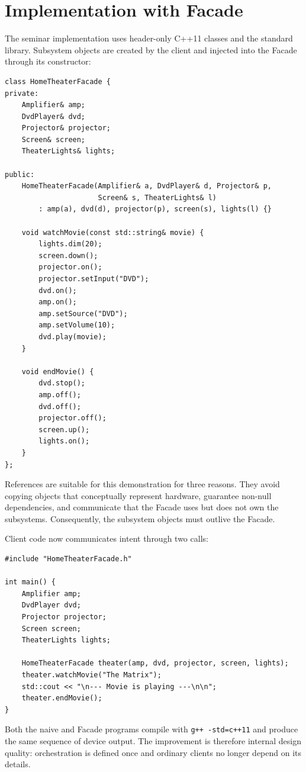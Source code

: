 \documentclass[11pt,a4paper]{report}
\begin{document}
\section{Implementation with Facade}
The seminar implementation uses header-only C++11 classes and the standard
library. Subsystem objects are created by the client and injected into the
Facade through its constructor:

\begin{lstlisting}[style=cpp]
class HomeTheaterFacade {
private:
    Amplifier& amp;
    DvdPlayer& dvd;
    Projector& projector;
    Screen& screen;
    TheaterLights& lights;

public:
    HomeTheaterFacade(Amplifier& a, DvdPlayer& d, Projector& p,
                      Screen& s, TheaterLights& l)
        : amp(a), dvd(d), projector(p), screen(s), lights(l) {}

    void watchMovie(const std::string& movie) {
        lights.dim(20);
        screen.down();
        projector.on();
        projector.setInput("DVD");
        dvd.on();
        amp.on();
        amp.setSource("DVD");
        amp.setVolume(10);
        dvd.play(movie);
    }

    void endMovie() {
        dvd.stop();
        amp.off();
        dvd.off();
        projector.off();
        screen.up();
        lights.on();
    }
};
\end{lstlisting}

References are suitable for this demonstration for three reasons. They avoid
copying objects that conceptually represent hardware, guarantee non-null
dependencies, and communicate that the Facade uses but does not own the
subsystems. Consequently, the subsystem objects must outlive the Facade.

Client code now communicates intent through two calls:

\begin{lstlisting}[style=cpp]
#include "HomeTheaterFacade.h"

int main() {
    Amplifier amp;
    DvdPlayer dvd;
    Projector projector;
    Screen screen;
    TheaterLights lights;

    HomeTheaterFacade theater(amp, dvd, projector, screen, lights);
    theater.watchMovie("The Matrix");
    std::cout << "\n--- Movie is playing ---\n\n";
    theater.endMovie();
}
\end{lstlisting}

Both the naive and Facade programs compile with
\texttt{g++ -std=c++11} and produce the same sequence of device output. The
improvement is therefore internal design quality: orchestration is defined once
and ordinary clients no longer depend on its details.
\end{document}
